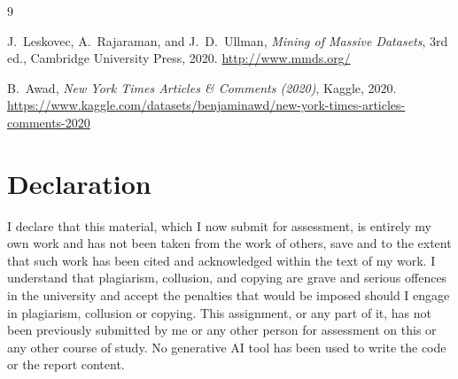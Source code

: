 \documentclass[11pt,a4paper]{article}
\begin{document}
\begin{thebibliography}{9}

J.~Leskovec, A.~Rajaraman, and J.~D.~Ullman,
\textit{Mining of Massive Datasets}, 3rd ed.,
Cambridge University Press, 2020.
\url{http://www.mmds.org/}

B.~Awad,
\textit{New York Times Articles \& Comments (2020)},
Kaggle, 2020.
\url{https://www.kaggle.com/datasets/benjaminawd/new-york-times-articles-comments-2020}

\end{thebibliography}

\section*{Declaration}

I declare that this material, which I now submit for assessment, is entirely my own
work and has not been taken from the work of others, save and to the extent that such
work has been cited and acknowledged within the text of my work. I understand that
plagiarism, collusion, and copying are grave and serious offences in the university
and accept the penalties that would be imposed should I engage in plagiarism,
collusion or copying. This assignment, or any part of it, has not been previously
submitted by me or any other person for assessment on this or any other course of
study. No generative AI tool has been used to write the code or the report content.
\end{document}
